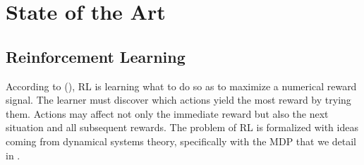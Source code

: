 \chapter{State of the Art} \label{chap:stateoftheart}

\section{Reinforcement Learning}
According to (\cite{sutton2018reinforcement}), \acf{RL} is learning what to do so as to maximize a numerical reward signal. The learner must discover which actions yield the most reward by trying them. Actions may affect not only the immediate reward but also the next situation and all subsequent rewards. The problem of \ac{RL} is formalized with ideas coming from dynamical systems theory, specifically with the \acf{MDP} that we detail in . 

